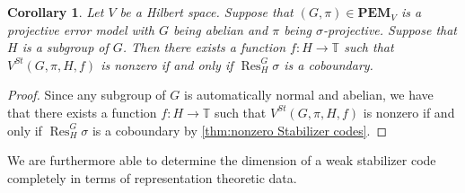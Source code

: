 \documentclass[11pt, oneside, reqno]{amsart}
\newcommand{\bbT}{\mathbb{T}}
\newcommand{\PEM}{\mathbf{PEM}}
\newcommand{\Res}{\operatorname{Res}}
\theoremstyle{definition}
\theoremstyle{plain}
\newtheorem{corollary}[definition]{Corollary}
\theoremstyle{remark}
\begin{document}
\begin{corollary}\label{cor:abelian error models}
    Let $V$ be a Hilbert space. Suppose that $(G,\pi) \in \PEM_V$ is a projective error model with $G$ being abelian and $\pi$ being $\sigma$-projective. Suppose that $H$ is a subgroup of $G$. Then there exists a function $f \colon H \to \bbT$ such that $V^{St}(G,\pi,H,f)$ is nonzero if and only if $\Res^G_H\sigma$ is a coboundary.
\end{corollary}
\begin{proof}
    Since any subgroup of $G$ is automatically normal and abelian, we have that there exists a function $f \colon H \to \bbT$ such that $V^{St}(G,\pi,H,f)$ is nonzero if and only if $\Res^G_H\sigma$ is a coboundary by \cref{thm:nonzero Stabilizer codes}.
\end{proof}

We are furthermore able to determine the dimension of a weak stabilizer code completely in terms of representation theoretic data.
\end{document}
